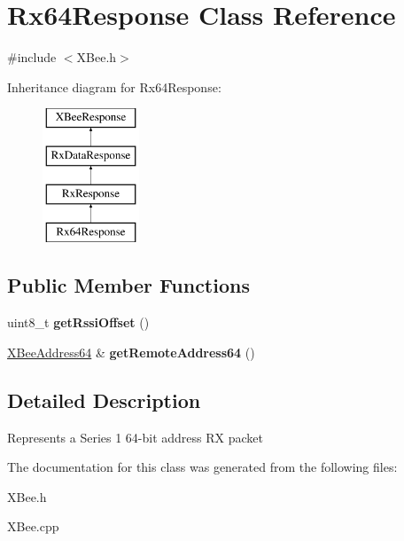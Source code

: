\hypertarget{classRx64Response}{\section{\-Rx64\-Response \-Class \-Reference}
\label{classRx64Response}
}


{\ttfamily \#include $<$\-X\-Bee.\-h$>$}

\-Inheritance diagram for \-Rx64\-Response\-:\begin{figure}[H]
\begin{center}
\leavevmode
\includegraphics[height=4.000000cm]{classRx64Response}
\end{center}
\end{figure}
\subsection*{\-Public \-Member \-Functions}
\begin{DoxyCompactItemize}
\item 
\hypertarget{classRx64Response_a5540b8d71a920049bee9ced78b37798e}{uint8\-\_\-t {\bfseries get\-Rssi\-Offset} ()}\label{classRx64Response_a5540b8d71a920049bee9ced78b37798e}

\item 
\hypertarget{classRx64Response_aefd36322881280a6b5f26eca12c2dca6}{\hyperlink{classXBeeAddress64}{\-X\-Bee\-Address64} \& {\bfseries get\-Remote\-Address64} ()}\label{classRx64Response_aefd36322881280a6b5f26eca12c2dca6}

\end{DoxyCompactItemize}


\subsection{\-Detailed \-Description}
\-Represents a \-Series 1 64-\/bit address \-R\-X packet 

\-The documentation for this class was generated from the following files\-:\begin{DoxyCompactItemize}
\item 
\-X\-Bee.\-h\item 
\-X\-Bee.\-cpp\end{DoxyCompactItemize}
